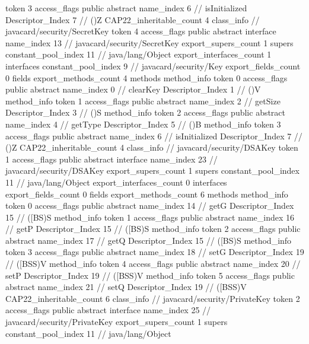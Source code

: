 {{{{{					token	3
					access_flags	public abstract
					name_index	6		// isInitialized
					Descriptor_Index	7		// ()Z
				}
			}
			CAP22_inheritable_count	4
		}
		class_info {		// javacard/security/SecretKey
			token	4
			access_flags	public abstract interface
			name_index	13		// javacard/security/SecretKey
			export_supers_count	1
			supers {
				constant_pool_index	11		// java/lang/Object
			}
			export_interfaces_count	1
			interfaces {
				constant_pool_index	9		// javacard/security/Key
			}
			export_fields_count	0
			fields {
			}
			export_methods_count	4
			methods {
				method_info {
					token	0
					access_flags	public abstract
					name_index	0		// clearKey
					Descriptor_Index	1		// ()V
				}
				method_info {
					token	1
					access_flags	public abstract
					name_index	2		// getSize
					Descriptor_Index	3		// ()S
				}
				method_info {
					token	2
					access_flags	public abstract
					name_index	4		// getType
					Descriptor_Index	5		// ()B
				}
				method_info {
					token	3
					access_flags	public abstract
					name_index	6		// isInitialized
					Descriptor_Index	7		// ()Z
				}
			}
			CAP22_inheritable_count	4
		}
		class_info {		// javacard/security/DSAKey
			token	1
			access_flags	public abstract interface
			name_index	23		// javacard/security/DSAKey
			export_supers_count	1
			supers {
				constant_pool_index	11		// java/lang/Object
			}
			export_interfaces_count	0
			interfaces {
			}
			export_fields_count	0
			fields {
			}
			export_methods_count	6
			methods {
				method_info {
					token	0
					access_flags	public abstract
					name_index	14		// getG
					Descriptor_Index	15		// ([BS)S
				}
				method_info {
					token	1
					access_flags	public abstract
					name_index	16		// getP
					Descriptor_Index	15		// ([BS)S
				}
				method_info {
					token	2
					access_flags	public abstract
					name_index	17		// getQ
					Descriptor_Index	15		// ([BS)S
				}
				method_info {
					token	3
					access_flags	public abstract
					name_index	18		// setG
					Descriptor_Index	19		// ([BSS)V
				}
				method_info {
					token	4
					access_flags	public abstract
					name_index	20		// setP
					Descriptor_Index	19		// ([BSS)V
				}
				method_info {
					token	5
					access_flags	public abstract
					name_index	21		// setQ
					Descriptor_Index	19		// ([BSS)V
				}
			}
			CAP22_inheritable_count	6
		}
		class_info {		// javacard/security/PrivateKey
			token	2
			access_flags	public abstract interface
			name_index	25		// javacard/security/PrivateKey
			export_supers_count	1
			supers {
				constant_pool_index	11		// java/lang/Object
}}}}
